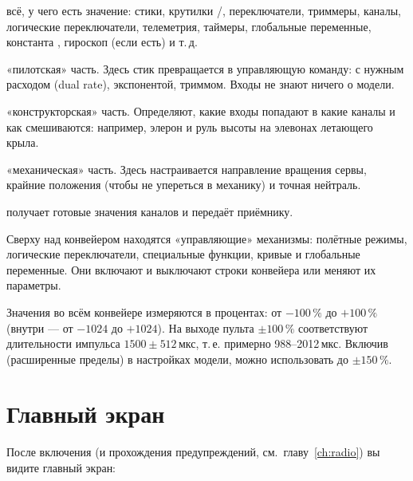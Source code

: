 \begin{description}[font=\sffamily\bfseries\color{etx}]
  \item[Источники (sources)] всё, у чего есть значение: стики, крутилки /,
        переключатели, триммеры, каналы, логические переключатели, телеметрия, таймеры,
        глобальные переменные, константа , гироскоп (если есть) и т.\,д.
  \item[Входы (Inputs)] «пилотская» часть. Здесь стик превращается в управляющую команду:
        с нужным расходом (dual rate), экспонентой, триммом. Входы не знают ничего о модели.
  \item[Миксеры (Mixes)] «конструкторская» часть. Определяют, какие входы попадают в какие
        каналы и как смешиваются: например, элерон и руль высоты на элевонах летающего крыла.
  \item[Выходы (Outputs)] «механическая» часть. Здесь настраивается направление вращения сервы,
        крайние положения (чтобы не упереться в механику) и точная нейтраль.
  \item[Радиомодуль] получает готовые значения каналов и передаёт приёмнику.
\end{description}

Сверху над конвейером находятся «управляющие» механизмы: полётные режимы, логические
переключатели, специальные функции, кривые и глобальные переменные. Они включают и выключают
строки конвейера или меняют их параметры.

\begin{note}
Значения во всём конвейере измеряются в процентах: от $-100\,\%$ до $+100\,\%$ (внутри ---
от $-1024$ до $+1024$). На выходе пульта $\pm100\,\%$ соответствуют длительности импульса
$1500\pm512$\,мкс, т.\,е. примерно 988--2012\,мкс. Включив 
(расширенные пределы) в настройках модели, можно использовать до $\pm150\,\%$.
\end{note}

\section{Главный экран}

После включения (и прохождения предупреждений, см.\ главу~\ref{ch:radio}) вы видите главный экран:

\begin{center}
\end{center}

